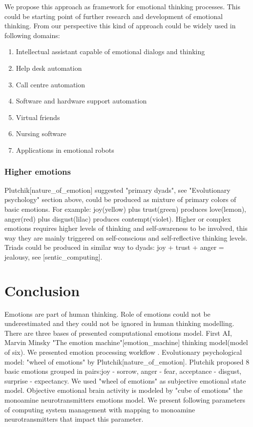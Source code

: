 We propose this approach as framework for emotional thinking processes. This could be starting point of further research and development of emotional thinking. From our perspective this kind of approach could be widely used in following domains:

\begin{enumerate}
\item  Intellectual assistant capable of emotional dialogs and thinking
\item  Help desk automation
\item  Call centre automation
\item  Software and hardware support automation
\item  Virtual friends
\item  Nursing software
\item  Applications in emotional robots
\end{enumerate}

\subsubsection{Higher emotions}

Plutchik[nature_of_emotion] suggested "primary dyads", see "Evolutionary psychology" section above, could be produced as mixture of primary colors of basic emotions. For example: joy(yellow) plus trust(green) produces love(lemon), anger(red) plus disgust(lilac) produces contempt(violet). Higher or complex emotions requires higher levels of thinking and self-awareness to be involved, this way they are mainly triggered on self-conscious and self-reflective thinking levels. Triads could be produced in similar way to dyads: joy + trust + anger = jealousy, see [sentic_computing].

\section{Conclusion}

Emotions are part of human thinking. Role of emotions could not be underestimated and they could not be ignored in human thinking modelling.
There are three bases of presented computational emotions model. First AI, Marvin Minsky "The emotion machine"[emotion_machine] thinking model(model of six). We presented emotion processing workflow . Evolutionary psychological model: "wheel of emotions" by Plutchik[nature_of_emotion]. Plutchik proposed 8 basic emotions grouped in pairs:joy - sorrow, anger - fear, acceptance - disgust, surprise - expectancy. We used "wheel of emotions" as subjective emotional state model. Objective emotional brain activity is modeled by "cube of emotions" the monoamine neurotransmitters emotions model. We present following parameters of computing system management with mapping to monoamine neurotransmitters
that impact this parameter.


